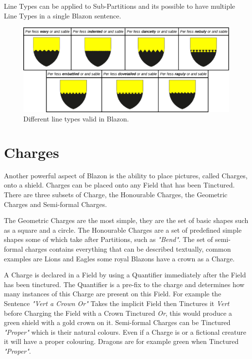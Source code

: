 Line Types can be applied to Sub-Partitions and its possible to have multiple Line Types in a single Blazon sentence. 

\begin{figure}[H]
  \centering
    \includegraphics[width=\textwidth]{blazon/images/linetypes.eps}
  \caption{Different line types valid in Blazon.\cite{linetypes}}
  \label{fig:lines}
  
\end{figure}


\section{Charges}
Another powerful aspect of Blazon is the ability to place pictures, called Charges, onto a shield.  Charges can be placed onto any Field that has been Tinctured.  There are three subsets of Charge, the Honourable Charges, the Geometric Charges and Semi-formal Charges.

The Geometric Charges are the most simple, they are the set of basic shapes such as a square and a circle.  The Honourable Charges are a set of predefined simple shapes some of which take after Partitions, such as \emph{"Bend"}.  The set of semi-formal charges contains everything that can be described textually, common examples are Lions and Eagles some royal Blazons have a crown as a Charge. 


A Charge is declared in a Field by using a Quantifier immediately after the Field has been tinctured.  The Quantifier is a pre-fix to the charge and determines how many instances of this Charge are present on this Field.  For example the Sentence \emph{"Vert a Crown Or"} Takes the implicit Field then Tinctures it \emph{Vert} before Charging the Field with a Crown Tinctured \emph{Or}, this would produce a green shield with a gold crown on it. Semi-formal Charges can be Tinctured \emph{"Proper"} which is their natural colours.  Even if a Charge is or a fictional creature it will have a proper colouring.  Dragons are for example green when Tinctured \emph{"Proper"}. 

